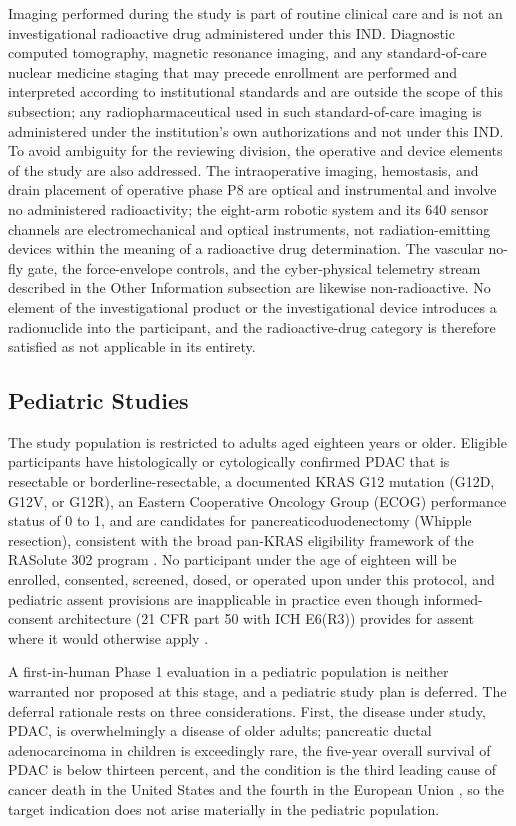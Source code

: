 Imaging performed during the study is part of routine clinical care and is not an
investigational radioactive drug administered under this IND. Diagnostic computed
tomography, magnetic resonance imaging, and any standard-of-care nuclear medicine
staging that may precede enrollment are performed and interpreted according to
institutional standards and are outside the scope of this subsection; any
radiopharmaceutical used in such standard-of-care imaging is administered under the
institution's own authorizations and not under this IND. To avoid ambiguity for the
reviewing division, the operative and device elements of the study are also
addressed. The intraoperative imaging, hemostasis, and drain placement of operative
phase P8 are optical and instrumental and involve no administered radioactivity; the
eight-arm robotic system and its 640 sensor channels are electromechanical and
optical instruments, not radiation-emitting devices within the meaning of a
radioactive drug determination. The vascular no-fly gate, the force-envelope
controls, and the cyber-physical telemetry stream described in the Other Information
subsection are likewise non-radioactive. No element of the investigational
product or the investigational device introduces a radionuclide into the
participant, and the radioactive-drug category is therefore satisfied as not
applicable in its entirety.

\clearpage

\subsection{Pediatric Studies}

The study population is restricted to adults aged eighteen years or older. Eligible
participants have histologically or cytologically confirmed PDAC that is resectable
or borderline-resectable, a documented KRAS G12 mutation (G12D, G12V, or G12R), an
Eastern Cooperative Oncology Group (ECOG) performance status of 0 to 1, and are
candidates for pancreaticoduodenectomy (Whipple resection), consistent with the
broad pan-KRAS eligibility framework of the RASolute 302 program
\cite{daraxwhipple}. No participant under the age of eighteen will be enrolled,
consented, screened, dosed, or operated upon under this protocol, and pediatric
assent provisions are inapplicable in practice even though informed-consent architecture (21 CFR part 50 with ICH E6(R3)) provides for assent
where it would otherwise apply \cite{cfr050paiuni}.

A first-in-human Phase 1 evaluation in a pediatric population is neither warranted
nor proposed at this stage, and a pediatric study plan is deferred. The deferral
rationale rests on three considerations. First, the disease under study, PDAC, is
overwhelmingly a disease of older adults; pancreatic ductal adenocarcinoma in
children is exceedingly rare, the five-year overall survival of PDAC is below
thirteen percent, and the condition is the third leading cause of cancer death in
the United States and the fourth in the European Union \cite{pdac060s2030}, so the
target indication does not arise materially in the pediatric population. 

